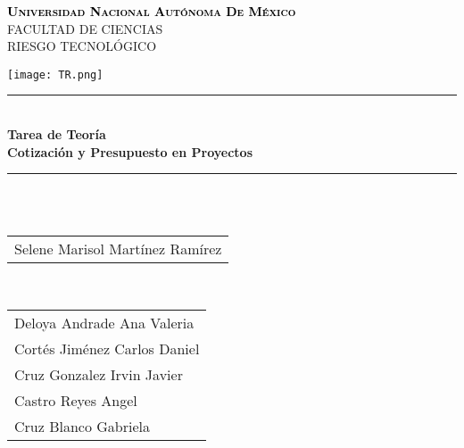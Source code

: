 \documentclass[12pt]{article}
\begin{document}
\begin{titlepage}
\begin{center}

\textsc{\Large \textcolor{black}{\textbf{Universidad Nacional Autónoma De México}}}\\[0.4cm]	

{\huge \Large \uppercase{Facultad de Ciencias} \\[0.4cm] }
{\huge \Large \uppercase{Riesgo Tecnológico} \\[1cm] }

\texttt{[image: TR.png]}\\[1cm]


\rule{\linewidth}{0.7mm} \\[0.4cm]
{ \huge \bfseries\color{cyan!70!black} Tarea de Teoría \\[0.3cm] }
{ \huge \bfseries\color{black} Cotización y Presupuesto en Proyectos \\[0.3cm] }
\rule{\linewidth}{0.7mm} \\[1cm]


\\[0.4cm]

\begin{tabular}{l}
\large Selene Marisol Martínez Ramírez \\[0.5cm]
\end{tabular}

\\[0.6cm]
\color{black}
\centering
\begin{tabular}{l}


\large Deloya Andrade Ana Valeria \\[0.4cm]

\large   Cortés Jiménez Carlos Daniel \\[0.4cm]

\large  Cruz Gonzalez Irvin Javier \\[0.4cm]

\large  Castro Reyes Angel  \\[0.4cm]

\large   Cruz Blanco Gabriela \\[0.4cm]
\end{tabular}

\vfill

\end{center}
\end{titlepage}
\end{document}

